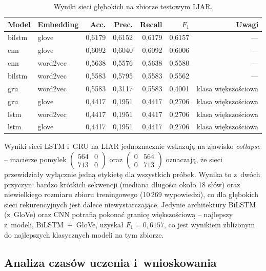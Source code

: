 \begin{table}[ht]
\centering
\caption{Wyniki sieci głębokich na zbiorze testowym LIAR.}
\label{tab:dl_liar}
\begin{tabular}{llrrrrr}
\toprule
Model & Embedding & Acc. & Prec. & Recall & $F_1$ & Uwagi \\
\midrule
bilstm & glove    & 0,6179 & 0,6152 & 0,6179 & 0,6157 & --- \\
cnn    & glove    & 0,6092 & 0,6040 & 0,6092 & 0,6006 & --- \\
cnn    & word2vec & 0,5638 & 0,5576 & 0,5638 & 0,5580 & --- \\
bilstm & word2vec & 0,5583 & 0,5795 & 0,5583 & 0,5562 & --- \\
gru    & word2vec & 0,5583 & 0,3117 & 0,5583 & 0,4001 & klasa większościowa \\
gru    & glove    & 0,4417 & 0,1951 & 0,4417 & 0,2706 & klasa większościowa \\
lstm   & word2vec & 0,4417 & 0,1951 & 0,4417 & 0,2706 & klasa większościowa \\
lstm   & glove    & 0,4417 & 0,1951 & 0,4417 & 0,2706 & klasa większościowa \\
\bottomrule
\end{tabular}
\end{table}

Wyniki sieci LSTM i~GRU na LIAR jednoznacznie wskazują na zjawisko
\textit{collapse} -- macierze pomyłek $\begin{pmatrix}564 & 0\\713 &
0\end{pmatrix}$ oraz $\begin{pmatrix}0 & 564\\0 & 713\end{pmatrix}$
oznaczają, że sieci przewidziały wyłącznie jedną etykietę dla
wszystkich próbek. Wynika to z~dwóch przyczyn: bardzo krótkich
sekwencji (mediana długości około 18 słów) oraz niewielkiego rozmiaru
zbioru treningowego (10\,269 wypowiedzi), co dla głębokich sieci
rekurencyjnych jest dalece niewystarczające. Jedynie architektury
BiLSTM (z~GloVe) oraz CNN potrafią pokonać granicę większościową --
najlepszy z~modeli, BiLSTM~+~GloVe, uzyskał \(F_1 = 0{,}6157\), co
jest wynikiem zbliżonym do najlepszych klasycznych modeli na tym
zbiorze.

\subsection{Analiza czasów uczenia i~wnioskowania}
\label{sec:wyniki_glebokie_czas}


